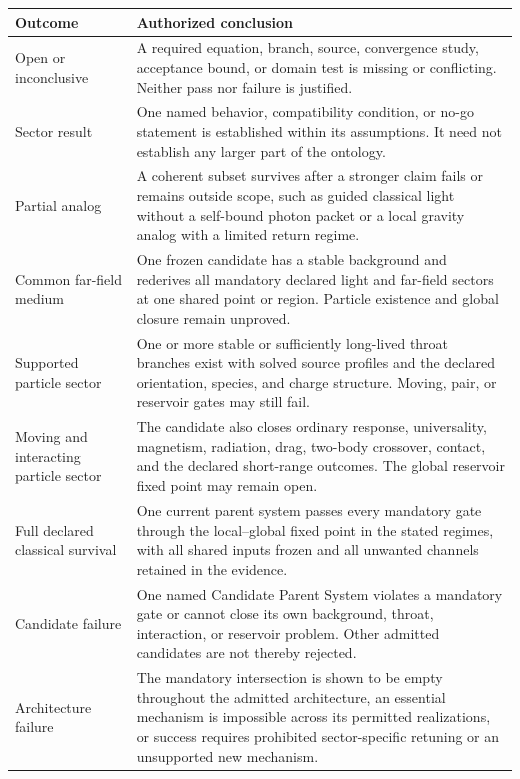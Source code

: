 \begin{center}
\begin{tabularx}{\textwidth}{@{}L{0.27\textwidth}X@{}}
\toprule
\textbf{Outcome} & \textbf{Authorized conclusion} \\
\midrule
Open or inconclusive
& A required equation, branch, source, convergence study, acceptance bound, or
  domain test is missing or conflicting. Neither pass nor failure is justified. \\
Sector result
& One named behavior, compatibility condition, or no-go statement is established
  within its assumptions. It need not establish any larger part of the ontology. \\
Partial analog
& A coherent subset survives after a stronger claim fails or remains outside
  scope, such as guided classical light without a self-bound photon packet or a
  local gravity analog with a limited return regime. \\
Common far-field medium
& One frozen candidate has a stable background and rederives all mandatory
  declared light and far-field sectors at one shared point or region. Particle
  existence and global closure remain unproved. \\
Supported particle sector
& One or more stable or sufficiently long-lived throat branches exist with
  solved source profiles and the declared orientation, species, and charge
  structure. Moving, pair, or reservoir gates may still fail. \\
Moving and interacting particle sector
& The candidate also closes ordinary response, universality, magnetism,
  radiation, drag, two-body crossover, contact, and the declared short-range
  outcomes. The global reservoir fixed point may remain open. \\
Full declared classical survival
& One current parent system passes every mandatory gate through the local--global
  fixed point in the stated regimes, with all shared inputs frozen and all
  unwanted channels retained in the evidence. \\
Candidate failure
& One named Candidate Parent System violates a mandatory gate or cannot close
  its own background, throat, interaction, or reservoir problem. Other admitted
  candidates are not thereby rejected. \\
Architecture failure
& The mandatory intersection is shown to be empty throughout the admitted
  architecture, an essential mechanism is impossible across its permitted
  realizations, or success requires prohibited sector-specific retuning or an
  unsupported new mechanism. \\
\bottomrule
\end{tabularx}
\end{center}

